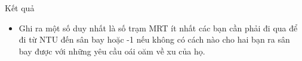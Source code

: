 Kết quả  
\begin{itemize}
	\item     Ghi ra một số duy nhất là         số trạm MRT ít nhất        các bạn cần phải đi qua để đi từ NTU đến sân bay hoặc -1 nếu không có cách nào cho hai bạn ra sân bay được với những yêu cầu oái oăm về xu của họ.   
\end{itemize}